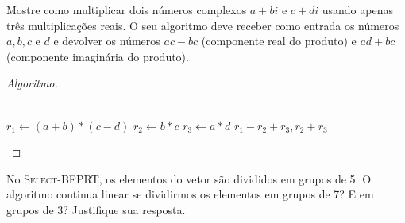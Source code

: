 \documentclass[12pt]{article}
\newenvironment{problem}[2][Ex]{\begin{trivlist}
\item[\hskip \labelsep {\bfseries #1}\hskip \labelsep {\bfseries #2.}]}{\end{trivlist}}
\begin{document}
\begin{problem}{13}
Mostre como multiplicar dois números complexos $a+bi$ e $c+di$ usando apenas três multiplicações reais. O seu algoritmo deve receber como entrada os números $a, b, c$ e $d$ e devolver os números $ac-bc$ (componente real do produto) e $ad+bc$ (componente imaginária do produto).
\end{problem}

\begin{proof}[Algoritmo]
\begin{algorithmic}
\\
\State $r_1 \gets (a+b)*(c-d)$
\State $r_2 \gets b*c$
\State $r_3 \gets a*d$
\State \Return $r_1-r_2+r_3, r_2+r_3$
\end{algorithmic}
\end{proof}

\begin{problem}{14}
No \textsc{Select-BFPRT}, os elementos do vetor são divididos em grupos de 5. O algoritmo continua linear se dividirmos os elementos em grupos de 7? E em grupos de 3? Justifique sua resposta.
\end{problem}
\end{document}
